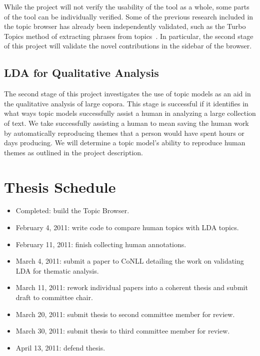 \documentclass[ms]{byuprop}
\begin{document}
While the project will not verify the usability of the tool as a whole, some
parts of the tool can be individually verified.  Some of the previous research
included in the topic browser has already been independently validated, such as
the Turbo Topics method of extracting phrases from
topics~\cite{blei-2009-turbo-topics}.  In particular, the second stage of this
project will validate the novel contributions in the sidebar of the browser.

\subsection{LDA for Qualitative Analysis}

The second stage of this project investigates the use of topic models as an aid
in the qualitative analysis of large copora.  This stage is successful if it
identifies in what ways topic models successfully assist a human in analyzing a
large collection of text.  We take successfully assisting a human to mean
saving the human work by automatically reproducing themes that a person would
have spent hours or days producing.  We will determine a topic model's ability
to reproduce human themes as outlined in the project description.  



\section{Thesis Schedule}

\begin{itemize}

\item Completed: build the Topic Browser.
  
\item February 4, 2011: write code to compare human topics with LDA topics.

\item February 11, 2011: finish collecting human annotations.

\item March 4, 2011: submit a paper to CoNLL detailing the work on validating
  LDA for thematic analysis.

\item March 11, 2011: rework individual papers into a coherent thesis and
submit draft to committee chair.

\item March 20, 2011: submit thesis to second committee member for review.

\item March 30, 2011: submit thesis to third committee member for review.

\item April 13, 2011: defend thesis.

\end{itemize}



\renewcommand\bibsection{\section{Annotated Bibliography}}


\end{document}

